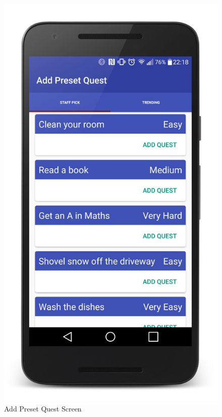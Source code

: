 \begin{figure}[ht]
\begin{minipage}[b]{0.45\linewidth}
    \includegraphics[width=.8\linewidth]{../images/Screenshot/AddPresetQuestScreen.jpg}
    \caption{Add Preset Quest Screen} 
    \vspace{4ex}
  \end{minipage} 
  \begin{minipage}[b]{0.45\linewidth}
    \centering

\end{minipage}
\end{figure}
